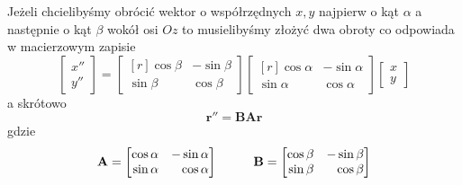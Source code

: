 \documentclass[12pt,a4paper,leqno]{article}
\numberwithin{equation}{section}
\begin{document}
Jeżeli chcielibyśmy obrócić wektor o współrzędnych $x, y$ najpierw o kąt $\alpha$ a następnie o kąt $\beta$
wokół osi $Oz$ to musielibyśmy złożyć dwa obroty co odpowiada w macierzowym zapisie
\begin{equation}
\begin{bmatrix}
x'' \\ 
y'' 
\end{bmatrix}
=
\begin{bmatrix*}[r]
 \cos \beta  & -\sin \beta  \\
 \sin \beta  &  \cos \beta
\end{bmatrix*}
\begin{bmatrix*}[r]
 \cos \alpha  & -\sin \alpha  \\
 \sin \alpha  &  \cos \alpha
\end{bmatrix*}
\begin{bmatrix}
x \\ 
y 
\end{bmatrix}
\end{equation}
a skrótowo
\begin{equation}
\mathbf{r}'' =    \mathbf{B} \mathbf{A} \mathbf{r}
\end{equation}
gdzie
\begin{equation}
\mathbf{A}
=
\begin{bmatrix*}[r]
 \cos \alpha  & -\sin \alpha  \\
 \sin \alpha  &  \cos \alpha
\end{bmatrix*}
\hspace{1.0cm}
\mathbf{B}
=
\begin{bmatrix*}[r]
 \cos \beta  & -\sin \beta  \\
 \sin \beta  &  \cos \beta
\end{bmatrix*}
\end{equation}
\end{document}
